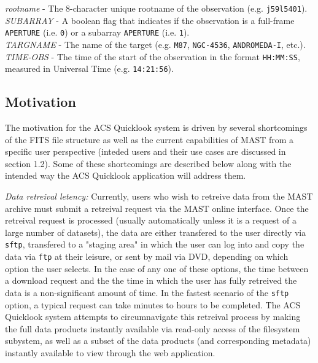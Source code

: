 \documentclass[10pt,journal,compsoc]{IEEEtran}
\begin{document}
\textit{rootname} - The 8-character unique rootname of the observation (e.g. \texttt{j59l5401}).\\

\textit{SUBARRAY} - A boolean flag that indicates if the observation is a full-frame \texttt{APERTURE}
(i.e. \texttt{0}) or a subarray \texttt{APERTURE} (i.e. \texttt{1}).\\

\textit{TARGNAME} - The name of the target (e.g. \texttt{M87}, \texttt{NGC-4536}, \texttt{ANDROMEDA-I}, etc.).\\

\textit{TIME-OBS} - The time of the start of the observation in the format \texttt{HH:MM:SS}, measured in
Universal Time (e.g. \texttt{14:21:56}).\\


\subsection{Motivation}

The motivation for the ACS Quicklook system is driven by several shortcomings of the
FITS file structure as well as the current capabilities of MAST from a specific
user perspective (inteded users and their use cases are discussed in section 1.2).
Some of these shortcomings are described below along with the intended way the
ACS Quicklook application will address them.\newline

\textit{Data retreival letency:} Currently, users who wish to retreive data from
the MAST archive must submit a retreival request via the MAST online interface.
Once the retreival request is processed (usually automatically unless it is a
request of a large number of datasets), the data are either transfered to the user
directly via \texttt{sftp}, transfered to a "staging area" in which the user can
log into and copy the data via \texttt{ftp} at their leisure, or sent by mail via
DVD, depending on which option the user selects.  In the case of any one of these
options, the time between a download request and the the time in which the user
has fully retreived the data is a non-significant amount of time.  In the fastest
scenario of the \texttt{sftp} option, a typical request can take minutes to hours
to be completed.  The ACS Quicklook system attempts to circumnavigate this retreival
process by making the full data products instantly available via read-only access of
the filesystem subystem, as well as a subset of the data products (and corresponding
metadata) instantly available to view through the web application.
\end{document}
